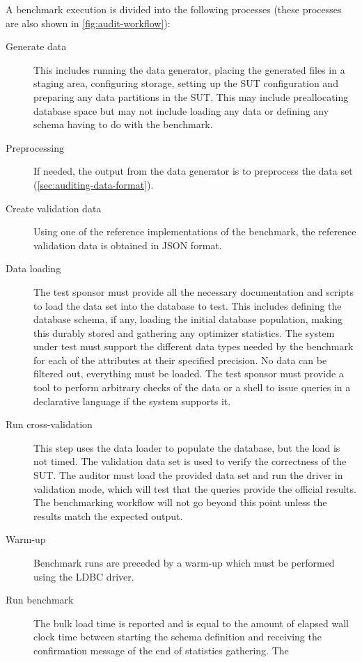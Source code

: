 A benchmark execution is divided into the following processes (these processes are also shown in \autoref{fig:audit-workflow}):

\begin{description}
    \item[Generate data] This includes running the data generator, placing the generated files in a staging area,
        configuring storage, setting up the SUT configuration and preparing any data partitions in the SUT. This may include
        preallocating database space but may not include loading any data or defining any schema having to do with the
        benchmark.
    \item[Preprocessing] If needed, the output from the data generator is to preprocess the data set (\autoref{sec:auditing-data-format}).
    \item[Create validation data] Using one of the reference implementations of the benchmark, the reference validation data is obtained in JSON format.
    \item[Data loading] The test sponsor must provide all the necessary documentation and scripts to load the data set
        into the database to test. This includes defining the database schema, if any, loading the initial database
        population, making this durably stored and gathering any optimizer statistics. The system under test must support
        the different data types needed by the benchmark for each of the attributes at their specified precision. No data
        can be filtered out, everything must be loaded. The test sponsor must provide a tool to perform arbitrary checks of
        the data or a shell to issue queries in a declarative language if the system supports it.
    \item[Run cross-validation] This step uses the data loader to populate the database, but the load is not timed. The
        validation data set is used to verify the correctness of the SUT. The auditor must load the provided data set and run the driver in validation mode, which will test that the queries provide the
        official results.  The benchmarking workflow will not go beyond this point unless the results match the expected
        output.
    \item[Warm-up] Benchmark runs are preceded by a warm-up which must be performed using the LDBC driver.
    \item[Run benchmark] The bulk load time is reported and is equal to the amount of elapsed wall clock time between
        starting the schema definition and receiving the confirmation message of the end of statistics gathering. The

\end{description}
